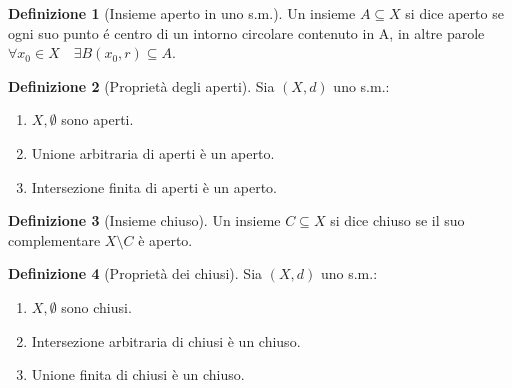 \documentclass[leqno]{article}
\theoremstyle{definition}
\newtheorem{definition}{Definizione}[section]
\numberwithin{equation}{section}
\theoremstyle{remark}
\begin{document}
	
	\begin{definition}[Insieme aperto in uno s.m.]
		Un insieme $A\subseteq X$ si dice aperto se ogni suo punto é centro di un intorno circolare contenuto in A, in altre parole $\forall x_0 \in X \quad \exists B(x_0,r)\subseteq A$. 
	\end{definition}
	
	\begin{definition}[Proprietà degli aperti]
		Sia $(X,d)$ uno s.m.:
		\begin{enumerate}
			\item $X,\emptyset$ sono aperti.
			\item Unione arbitraria di aperti è un aperto.
			\item Intersezione finita di aperti è un aperto.
		\end{enumerate}
		
	\end{definition}
	\begin{definition}[Insieme chiuso]
		Un insieme $C \subseteq X$ si dice chiuso se il suo complementare $X \setminus C$ è aperto.
	\end{definition}
	
	\begin{definition}[Proprietà dei chiusi]
		Sia $(X,d)$ uno s.m.:
		\begin{enumerate}
			\item $X,\emptyset$ sono chiusi.
			\item Intersezione arbitraria di chiusi è un chiuso.
			\item Unione finita di chiusi è un chiuso.
		\end{enumerate}
	\end{definition}
	
\end{document}
